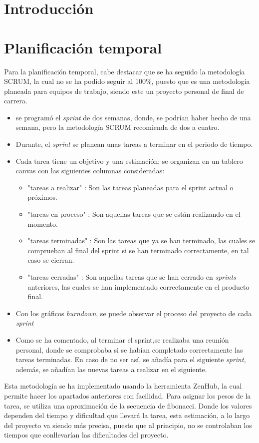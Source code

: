 
\section{Introducción}

\section{Planificación temporal}
Para la planificación temporal, cabe destacar que se ha seguido la metodología SCRUM, la cual no se ha podido seguir al 100\%, puesto que es una metodología planeada para equipos de trabajo, siendo este un proyecto personal de final de carrera. 

\begin{itemize}
    \item se programó el \textit{sprint} de dos semanas, donde, se podrían haber hecho de una semana, pero la metodología SCRUM recomienda de dos a cuatro.
    \item Durante, el  \textit{sprint} se planean unas tareas a terminar en el periodo de tiempo.
    \item Cada tarea tiene un objetivo y una estimación; se organizan en un tablero canvas con las siguientes columnas consideradas:
    \begin{itemize}
        \item "tareas a realizar" : Son las tareas planeadas para el sprint actual o próximos.
        \item "tareas en proceso" : Son aquellas tareas que se están realizando en el momento.
        \item "tareas terminadas" : Son las tareas que ya se han terminado, las cuales se comprueban al final del sprint si se han terminado correctamente, en tal caso se cierran.
        \item "tareas cerradas" : Son aquellas tareas que se han cerrado en \textit{sprints} anteriores, las cuales se han implementado correctamente en el producto final. 
    \end{itemize}
    \item Con los gráficos \textit{burndown}, se puede observar el proceso del proyecto de cada \textit{sprint}
    \item Como se ha comentado, al terminar el sprint,se realizaba una reunión personal, donde se comprobaba si se habían completado correctamente las tareas terminadas. En caso de no ser así, se añadía para el siguiente \textit{sprint}, además, se añadían las nuevas tareas a realizar en el siguiente.
\end{itemize}
Esta metodología se ha implementado usando la herramienta ZenHub, la cual permite hacer los apartados anteriores con facilidad.
Para asignar los pesos de la tarea, se utiliza una aproximación de la secuencia de fibonacci. Donde los valores dependen del tiempo y dificultad que llevará la tarea, esta estimación, a lo largo del proyecto va siendo más precisa, puesto que al principio, no se controlaban los tiempos que conllevarían las dificultades del proyecto.

